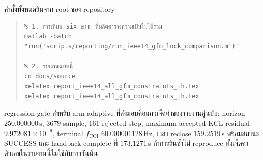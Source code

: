 \documentclass[12pt,a4paper]{article}
\theoremstyle{remark}
\newcommand{\code}[1]{{\ttfamily\small\hyphenchar\font=-1 #1}}
\begin{document}
คำสั่งทั้งหมดรันจาก root ของ repository

\begin{quote}\small
\begin{verbatim}
% 1. การเทียบ six arm ที่ผลิตตารางความเป็นไปได้ร่วม
matlab -batch "run('scripts/reporting/run_ieee14_gfm_lock_comparison.m')"

% 2. รายงานฉบับนี้
cd docs/source
xelatex report_ieee14_all_gfm_constraints_th.tex
xelatex report_ieee14_all_gfm_constraints_th.tex
\end{verbatim}
\end{quote}

\noindent
regression gate สำหรับ arm adaptive ที่ส่งมอบคือแถวเจ็ดค่าของรายงานคู่ฉบับ:
horizon $250.000000$\,s, $3679$ sample, $161$ rejected step, maximum accepted
KCL residual $9.972081\times10^{-9}$, terminal $f_{\mathrm{COI}}$
$60.000001128$\,Hz, เวลา reclose $159.2519$\,s พร้อมสถานะ \code{SUCCESS}
และ handback complete ที่ $173.1271$\,s ถ้าการรันซ้ำไม่ reproduce ทั้งเจ็ดค่า
ตัวเลขในรายงานนี้ไม่ใช้กับการรันนั้น
\end{document}
